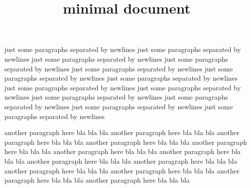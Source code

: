 \title{minimal document}

just some paragraphs separated by newlines
just some paragraphs separated by newlines
just some paragraphs separated by newlines
just some paragraphs separated by newlines
just some paragraphs separated by newlines
just some paragraphs separated by newlines
just some paragraphs separated by newlines
just some paragraphs separated by newlines
just some paragraphs separated by newlines
just some paragraphs separated by newlines
just some paragraphs separated by newlines
just some paragraphs separated by newlines
just some paragraphs separated by newlines


another paragraph here bla bla bla
another paragraph here bla bla bla
another paragraph here bla bla bla
another paragraph here bla bla bla
another paragraph here bla bla bla
another paragraph here bla bla bla
another paragraph here bla bla bla
another paragraph here bla bla bla
another paragraph here bla bla bla
another paragraph here bla bla bla
another paragraph here bla bla bla
another paragraph here bla bla bla
another paragraph here bla bla bla
